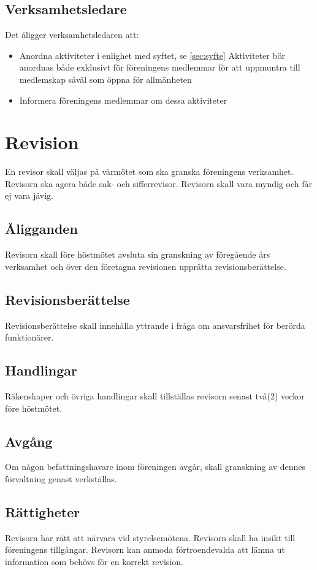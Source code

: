\documentclass[11pt,a4paper]{article}
\begin{document}
\subsection{Verksamhetsledare}\label{sec:event}
Det åligger verksamhetsledaren att:
\begin{itemize}
\item Anordna aktiviteter i enlighet med syftet, se \ref{sec:syfte} Aktiviteter bör anordnas både exklusivt för föreningens medlemmar för att uppmuntra till medlemskap såväl som öppna för allmänheten
\item Informera föreningens medlemmar om dessa aktiviteter
\end{itemize}

\section{Revision}
En revisor skall väljas på vårmötet som ska granska föreningens verksamhet. Revisorn ska agera både sak- och sifferrevisor. Revisorn skall vara myndig och får ej vara jävig.
\subsection{Åligganden}
Revisorn skall före höstmötet avsluta sin granskning av föregående års verksamhet och över den företagna revisionen upprätta revisionsberättelse.
\subsection{Revisionsberättelse}
Revisionsberättelse skall innehålla yttrande i fråga om ansvarsfrihet för berörda 
funktionärer. 
\subsection{Handlingar}
Räkenskaper och övriga handlingar skall tillställas revisorn senast två(2) veckor före höstmötet.
\subsection{Avgång}
Om någon befattningshavare inom föreningen avgår, skall granskning av dennes 
förvaltning genast verkställas.
\subsection{Rättigheter}
Revisorn har rätt att närvara vid styrelsemötena. Revisorn skall ha insikt till föreningens tillgångar. Revisorn kan anmoda förtroendevalda att lämna ut information som behövs för en korrekt revision.
\end{document}
